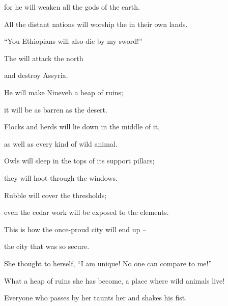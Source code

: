 {\par }{\Q for
he will weaken
all
the gods
of the earth.
\par }{\Q All
the distant nations
will worship
the
{} in their own lands.
\par }{\Q {}“You
Ethiopians
will also
die by my sword!”
\par }{\Q {}The
{} will attack
the north
\par }{\Q and destroy
Assyria.
\par }{\Q He will make
Nineveh
a heap of ruins;
\par }{\Q it will be as barren
as the desert.
\par }{\Q {}Flocks and herds
will lie down
in the middle
of it,
\par }{\Q as well as
every kind
of wild animal.
\par }{\Q Owls
will sleep
in the tops of
its support pillars;
\par }{\Q they will hoot
through the windows.
\par }{\Q Rubble
will cover the thresholds;
\par }{\Q even
the cedar work
will be exposed to the elements.
\par }{\Q {}This
is how the once-proud
city will end up –
\par }{\Q the city that was so secure.
\par }{\Q She thought to herself, “I am unique! No one can compare to me!”
\par }{\Q What a heap of ruins she has become, a place where wild animals live!
\par }{\Q Everyone who passes by her taunts her and shakes his fist.

\par }
